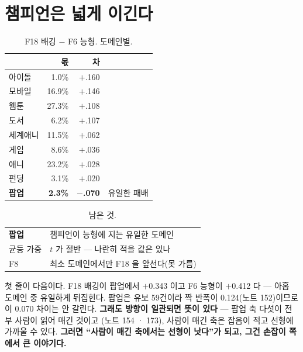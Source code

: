 \documentclass[10pt]{article}
\begin{document}
\section{챔피언은 넓게 이긴다}

\begin{table}[t]
\centering\tsize
\caption{F18 배깅 $-$ F6 능형. 도메인별.}
\begin{tabular}{lrrr}
\toprule
& 몫 & 차 & \\
\midrule
아이돌 & 1.0\% & $+$.160 & \\
모바일 & 16.9\% & $+$.146 & \\
웹툰 & 27.3\% & $+$.108 & \\
도서 & 6.2\% & $+$.107 & \\
세계애니 & 11.5\% & $+$.062 & \\
게임 & 8.6\% & $+$.036 & \\
애니 & 23.2\% & $+$.028 & \\
펀딩 & 3.1\% & $+$.020 & \\
\midrule
\textbf{팝업} & \textbf{2.3\%} & \textbf{$-$.070} & 유일한 패배 \\
\bottomrule
\end{tabular}
\end{table}



\begin{table}[t]
\centering\tsize
\caption{남은 것.}
\begin{tabular}{ll}
\toprule
\textbf{팝업} & 챔피언이 능형에 지는 유일한 도메인 \\
균등 가중 & $t$ 가 절반 --- 나란히 적을 값은 있나 \\
F8 & 최소 도메인에서만 F18 을 앞선다(못 가름) \\
\bottomrule
\end{tabular}
\end{table}

첫 줄이 다음이다. F18 배깅이 팝업에서 $+$0.343 이고 F6 능형이 $+$0.412 다
--- 아홉 도메인 중 유일하게 뒤집힌다. 팝업은 유보 59건이라 짝 반폭이
0.124(노트 152)이므로 이 0.070 차이는 안 갈린다. \textbf{그래도 방향이
일관되면 뜻이 있다} --- 팝업 축 다섯이 전부 사람이 읽어 매긴 것이고
(노트 154 · 173), 사람이 매긴 축은 잡음이 적고 선형에 가까울 수 있다.
\textbf{그러면 ``사람이 매긴 축에서는 선형이 낫다''가 되고, 그건 손잡이
쪽에서 큰 이야기다.}
\end{document}
